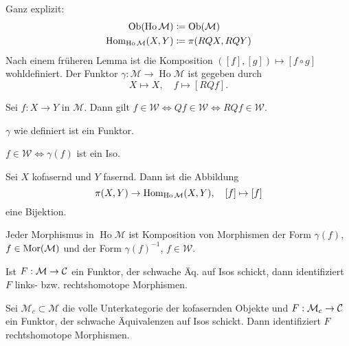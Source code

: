 \documentclass{cheat-sheet}
\newcommand{\Weak}{\mathcal{W}} %
\newcommand{\ModC}{\mathcal{M}} %
\DeclareMathOperator{\Ho}{Ho} %
\begin{document}
\begin{konstr}
  Ganz explizit:
  \begin{align*}
    \Ob(\Ho \ModC) & \coloneqq \Ob(\ModC) \\
    \Hom_{\Ho \ModC}(X, Y) & \coloneqq \pi(RQX, RQY)
  \end{align*}
  Nach einem früheren Lemma ist die Komposition $([f], [g]) \mapsto [f \circ g]$ wohldefiniert.
  Der Funktor $\gamma : \ModC \to \Ho \ModC$ ist gegeben durch
  \[
    X \mapsto X, \quad
    f \mapsto [RQf].
  \]
\end{konstr}

\begin{lem}
  Sei $f : X \to Y$ in $\ModC$. Dann gilt $f \!\in\! \Weak \Leftrightarrow Qf \!\in\! \Weak \Leftrightarrow RQf \!\in\! \Weak$.
\end{lem}

\begin{lem}
  $\gamma$ wie definiert ist ein Funktor.
\end{lem}


\begin{lem}
  $f \in \Weak \iff \gamma(f)$ ist ein Iso.
\end{lem}

\begin{bem}
  Sei $X$ kofasernd und $Y$ fasernd. Dann ist die Abbildung
  \[
    \pi(X, Y) \to \Hom_{\Ho \ModC}(X, Y), \quad
    [f] \mapsto [f]
  \]
  eine Bijektion.
\end{bem}

\begin{lem}
  Jeder Morphismus in $\Ho \ModC$ ist Komposition von Morphismen der Form $\gamma(f)$, $f \in \Mor(\ModC)$ und der Form $\gamma(f)^{-1}$, $f \in \Weak$.
\end{lem}

\begin{lem}
  Ist $F : \ModC \to \Cat$ ein Funktor, der schwache Äq. auf Isos schickt, dann identifiziert $F$ links- bzw. rechtshomotope Morphismen.
\end{lem}

\begin{lem}
  Sei $\ModC_c \subset \ModC$ die volle Unterkategorie der kofasernden Objekte und $F : \ModC_c \to \Cat$ ein Funktor, der schwache Äquivalenzen auf Isos schickt. Dann identifiziert $F$ rechtshomotope Morphismen.
\end{lem}
\end{document}

